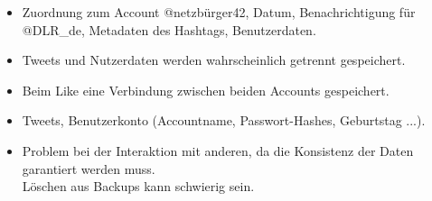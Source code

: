 \begin{frame}
\begin{multicols}{2}
		\begin{enumerate}[a)]
			 {
			\item \begin{itemize}
				      \color{TUMBlau}
				      \item Zuordnung zum Account @netzbürger42, Datum, Benachrichtigung für @DLR\_de,
				            Metadaten des Hashtags, Benutzerdaten.
				      \item Tweets und Nutzerdaten werden wahrscheinlich getrennt gespeichert.
				      \item Beim Like eine Verbindung zwischen beiden Accounts gespeichert.
			      \end{itemize}
			      }
			      \setcounter{enumi}{1}
			\item <4-> \begin{itemize}
				      \color{TUMBlau}
				      \item Tweets, Benutzerkonto (Accountname, Passwort-Hashes, Geburtstag ...).
				      \item Problem bei der Interaktion mit anderen,
				            da die Konsistenz der Daten garantiert werden muss. \\
				            Löschen aus Backups kann schwierig sein.
			      \end{itemize}
		\end{enumerate}
	\end{multicols}
\end{frame}


